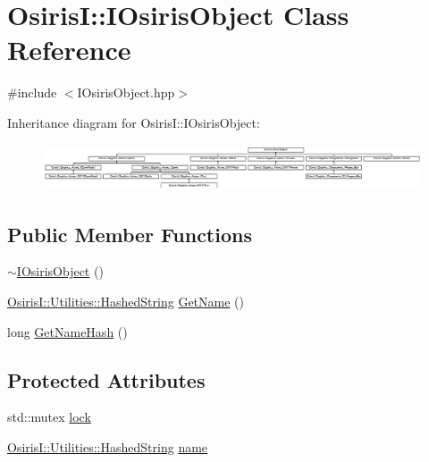 \hypertarget{class_osiris_i_1_1_i_osiris_object}{\section{Osiris\-I\-:\-:I\-Osiris\-Object Class Reference}
\label{class_osiris_i_1_1_i_osiris_object}
}


{\ttfamily \#include $<$I\-Osiris\-Object.\-hpp$>$}

Inheritance diagram for Osiris\-I\-:\-:I\-Osiris\-Object\-:\begin{figure}[H]
\begin{center}
\leavevmode
\includegraphics[height=1.379310cm]{class_osiris_i_1_1_i_osiris_object}
\end{center}
\end{figure}
\subsection*{Public Member Functions}
\begin{DoxyCompactItemize}
\item 
\hyperlink{class_osiris_i_1_1_i_osiris_object_add3fe0c141cefea2687be21eb6e88fbc}{$\sim$\-I\-Osiris\-Object} ()
\item 
\hyperlink{class_osiris_i_1_1_utilities_1_1_hashed_string}{Osiris\-I\-::\-Utilities\-::\-Hashed\-String} \hyperlink{class_osiris_i_1_1_i_osiris_object_a02671909537943ba7e1ac6aadd27d3f6}{Get\-Name} ()
\item 
long \hyperlink{class_osiris_i_1_1_i_osiris_object_a15be581d0c0ec630b918620d2a3096ac}{Get\-Name\-Hash} ()
\end{DoxyCompactItemize}
\subsection*{Protected Attributes}
\begin{DoxyCompactItemize}
\item 
std\-::mutex \hyperlink{class_osiris_i_1_1_i_osiris_object_a665623f1dafeec47b919f298a631ea61}{lock}
\item 
\hyperlink{class_osiris_i_1_1_utilities_1_1_hashed_string}{Osiris\-I\-::\-Utilities\-::\-Hashed\-String} \hyperlink{class_osiris_i_1_1_i_osiris_object_a6a3324b9c5ea3afabc9f3ffd9b666db9}{name}
\end{DoxyCompactItemize}


